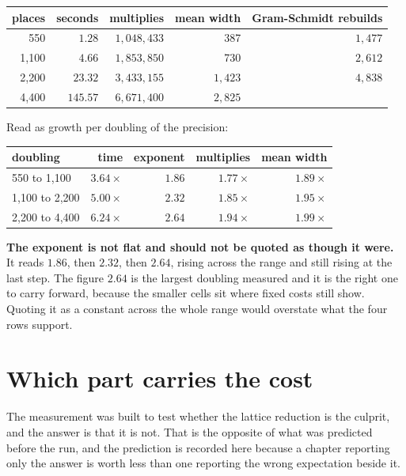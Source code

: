 \begin{center}
\begin{tabular}{@{}rrrrr@{}}
\toprule
places & seconds & multiplies & mean width & Gram-Schmidt rebuilds \\
\midrule
550 & \(1.28\) & \(1{,}048{,}433\) & 387 & \(1{,}477\) \\
1{,}100 & \(4.66\) & \(1{,}853{,}850\) & 730 & \(2{,}612\) \\
2{,}200 & \(23.32\) & \(3{,}433{,}155\) & \(1{,}423\) & \(4{,}838\) \\
4{,}400 & \(145.57\) & \(6{,}671{,}400\) & \(2{,}825\) & \textemdash{} \\
\bottomrule
\end{tabular}
\end{center}

Read as growth per doubling of the precision:

\begin{center}
\begin{tabular}{@{}lrrrr@{}}
\toprule
doubling & time & exponent & multiplies & mean width \\
\midrule
550 to 1{,}100 & \(3.64\times\) & \(1.86\) & \(1.77\times\) & \(1.89\times\) \\
1{,}100 to 2{,}200 & \(5.00\times\) & \(2.32\) & \(1.85\times\) & \(1.95\times\) \\
2{,}200 to 4{,}400 & \(6.24\times\) & \(2.64\) & \(1.94\times\) & \(1.99\times\) \\
\bottomrule
\end{tabular}
\end{center}

\textbf{The exponent is not flat and should not be quoted as though it were.} It reads \(1.86\), then \(2.32\), then \(2.64\), rising across the range and still rising at the last step. The figure \(2.64\) is the largest doubling measured and it is the right one to carry forward, because the smaller cells sit where fixed costs still show. Quoting it as a constant across the whole range would overstate what the four rows support.

\section{Which part carries the cost}

The measurement was built to test whether the lattice reduction is the culprit, and the answer is that it is not. That is the opposite of what was predicted before the run, and the prediction is recorded here because a chapter reporting only the answer is worth less than one reporting the wrong expectation beside it.

